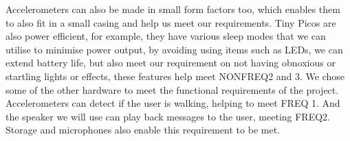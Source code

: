             Accelerometers can also be made in small form factors too, which enables them to also fit in a small casing and help
            us meet our requirements. Tiny Picos are also power efficient, for example, they have various sleep modes that we
            can utilise to minimise power output, by avoiding using items such as LEDs, we can extend battery life, but also
            meet our requirement on not having obnoxious or startling lights or effects, these features help meet NONFREQ2 and
            3. We chose some of the other hardware to meet the functional requirements of the project. Accelerometers can detect
            if the user is walking, helping to meet FREQ 1. And the speaker we will use can play back messages to the user,
            meeting FREQ2. Storage and microphones also enable this requirement to be met.


    
